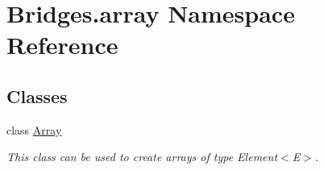 \hypertarget{namespace_bridges_1_1array}{}\section{Bridges.\+array Namespace Reference}
\label{namespace_bridges_1_1array}
\subsection*{Classes}
\begin{DoxyCompactItemize}
\item 
class \mbox{\hyperlink{class_bridges_1_1array_1_1_array}{Array}}
\begin{DoxyCompactList}\small\item\em This class can be used to create arrays of type Element$<$\+E$>$. \end{DoxyCompactList}\end{DoxyCompactItemize}
